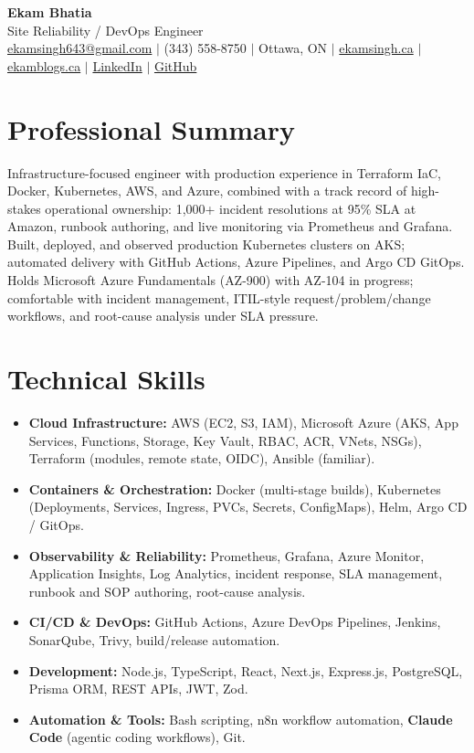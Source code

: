 \documentclass[11pt,a4paper]{article}
\begin{document}
\begin{center}
    {\LARGE \textbf{Ekam Bhatia}} \\
    \vspace{2pt}
    {\normalsize Site Reliability / DevOps Engineer} \\
    \vspace{4pt}
    \small
    \href{mailto:ekamsingh643@gmail.com}{ekamsingh643@gmail.com} $|$
    (343) 558-8750 $|$ Ottawa, ON $|$
    \href{https://www.ekamsingh.ca}{ekamsingh.ca} $|$
    \href{https://www.ekamblogs.ca}{ekamblogs.ca} $|$
    \href{https://www.linkedin.com/in/ekam-bhatia-335840168}{LinkedIn} $|$
    \href{https://github.com/bhat0155}{GitHub}
\end{center}

\section{Professional Summary}
Infrastructure-focused engineer with production experience in Terraform IaC, Docker, Kubernetes, AWS, and Azure, combined with a track record of high-stakes operational ownership: 1,000+ incident resolutions at 95\% SLA at Amazon, runbook authoring, and live monitoring via Prometheus and Grafana. Built, deployed, and observed production Kubernetes clusters on AKS; automated delivery with GitHub Actions, Azure Pipelines, and Argo CD GitOps. Holds Microsoft Azure Fundamentals (AZ-900) with AZ-104 in progress; comfortable with incident management, ITIL-style request/problem/change workflows, and root-cause analysis under SLA pressure.

\section{Technical Skills}
\begin{itemize}
    \item \textbf{Cloud Infrastructure:} AWS (EC2, S3, IAM), Microsoft Azure (AKS, App Services, Functions, Storage, Key Vault, RBAC, ACR, VNets, NSGs), Terraform (modules, remote state, OIDC), Ansible (familiar).
    \item \textbf{Containers \& Orchestration:} Docker (multi-stage builds), Kubernetes (Deployments, Services, Ingress, PVCs, Secrets, ConfigMaps), Helm, Argo CD / GitOps.
    \item \textbf{Observability \& Reliability:} Prometheus, Grafana, Azure Monitor, Application Insights, Log Analytics, incident response, SLA management, runbook and SOP authoring, root-cause analysis.
    \item \textbf{CI/CD \& DevOps:} GitHub Actions, Azure DevOps Pipelines, Jenkins, SonarQube, Trivy, build/release automation.
    \item \textbf{Development:} Node.js, TypeScript, React, Next.js, Express.js, PostgreSQL, Prisma ORM, REST APIs, JWT, Zod.
    \item \textbf{Automation \& Tools:} Bash scripting, n8n workflow automation, \textbf{Claude Code} (agentic coding workflows), Git.
\end{itemize}
\end{document}
